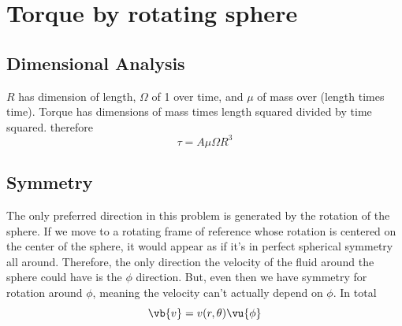 \clearpage
\section{Torque by rotating sphere}
\subsection{Dimensional Analysis}
\(R\) has dimension of length, \(\Omega \) of 1 over time, and \(\mu\) of mass over (length times time). Torque has dimensions of mass times length squared divided by time squared. therefore 
\begin{equation}
    \tau = A\mu\Omega R^3
\end{equation}
\subsection{Symmetry}
The only preferred direction in this problem is generated by the rotation of the sphere. If we move to a rotating frame of reference whose rotation is centered on the center of the sphere, it would appear as if it's in perfect spherical symmetry all around. Therefore, the only direction the velocity of the fluid around the sphere could have is the \(\phi\) direction. But, even then we have symmetry for rotation around \(\phi\), meaning the velocity can't actually depend on \(\phi\). In total
\begin{equation}
    \vb{v} = v(r,\theta)\vu{\phi}
\end{equation}
